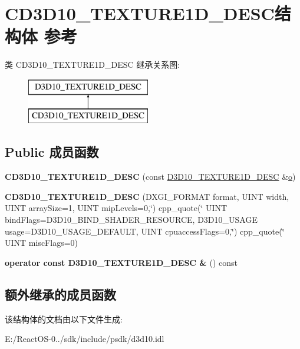 \hypertarget{struct_c_d3_d10___t_e_x_t_u_r_e1_d___d_e_s_c}{}\section{C\+D3\+D10\+\_\+\+T\+E\+X\+T\+U\+R\+E1\+D\+\_\+\+D\+E\+S\+C结构体 参考}
\label{struct_c_d3_d10___t_e_x_t_u_r_e1_d___d_e_s_c}
类 C\+D3\+D10\+\_\+\+T\+E\+X\+T\+U\+R\+E1\+D\+\_\+\+D\+E\+SC 继承关系图\+:\begin{figure}[H]
\begin{center}
\leavevmode
\includegraphics[height=2.000000cm]{struct_c_d3_d10___t_e_x_t_u_r_e1_d___d_e_s_c}
\end{center}
\end{figure}
\subsection*{Public 成员函数}
\begin{DoxyCompactItemize}
\item 
\mbox{\label{struct_c_d3_d10___t_e_x_t_u_r_e1_d___d_e_s_c_a6e472a51d28808b4fa50289d690f51ff}} 
{\bfseries C\+D3\+D10\+\_\+\+T\+E\+X\+T\+U\+R\+E1\+D\+\_\+\+D\+E\+SC} (const \hyperlink{struct_d3_d10___t_e_x_t_u_r_e1_d___d_e_s_c}{D3\+D10\+\_\+\+T\+E\+X\+T\+U\+R\+E1\+D\+\_\+\+D\+E\+SC} \&\hyperlink{opengl_2mesa_2main_2extensions_8c_ac02068cf344ef10efe2778c164d1233e}{o})
\item 
\mbox{\label{struct_c_d3_d10___t_e_x_t_u_r_e1_d___d_e_s_c_aae54bda115d356e691f5ad71f5a9f19e}} 
{\bfseries C\+D3\+D10\+\_\+\+T\+E\+X\+T\+U\+R\+E1\+D\+\_\+\+D\+E\+SC} (D\+X\+G\+I\+\_\+\+F\+O\+R\+M\+AT format, U\+I\+NT width, U\+I\+NT array\+Size=1, U\+I\+NT mip\+Levels=0,\char`\"{})
cpp\+\_\+quote(\char`\"{} U\+I\+NT bind\+Flags=D3\+D10\+\_\+\+B\+I\+N\+D\+\_\+\+S\+H\+A\+D\+E\+R\+\_\+\+R\+E\+S\+O\+U\+R\+CE, D3\+D10\+\_\+\+U\+S\+A\+GE usage=D3\+D10\+\_\+\+U\+S\+A\+G\+E\+\_\+\+D\+E\+F\+A\+U\+LT, U\+I\+NT cpuaccess\+Flags=0,\char`\"{})
cpp\+\_\+quote(\char`\"{} U\+I\+NT misc\+Flags=0)
\item 
\mbox{\label{struct_c_d3_d10___t_e_x_t_u_r_e1_d___d_e_s_c_a54326e4c7949e90c5451265352e85f34}} 
{\bfseries operator const D3\+D10\+\_\+\+T\+E\+X\+T\+U\+R\+E1\+D\+\_\+\+D\+E\+S\+C \&} () const
\end{DoxyCompactItemize}
\subsection*{额外继承的成员函数}


该结构体的文档由以下文件生成\+:\begin{DoxyCompactItemize}
\item 
E\+:/\+React\+O\+S-\/0../sdk/include/psdk/d3d10.\+idl\end{DoxyCompactItemize}

